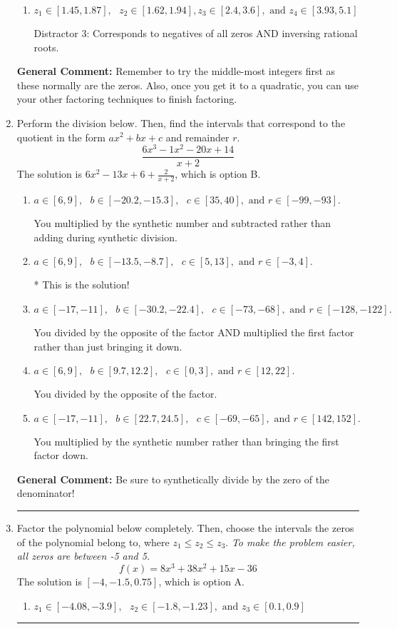 \documentclass{extbook}[14pt]
\newcommand{\litem}[1]{\item #1

\rule{\textwidth}{0.4pt}}
\begin{document}
\begin{enumerate}
{\begin{enumerate}[label=\Alph*.]
 Distractor 2: Corresponds to inversing rational roots.
\item \( z_1 \in [1.45, 1.87], \text{   }  z_2 \in [1.62, 1.94], z_3 \in [2.4, 3.6], \text{   and   } z_4 \in [3.93, 5.1] \)

 Distractor 3: Corresponds to negatives of all zeros AND inversing rational roots.
\end{enumerate}

\textbf{General Comment:} Remember to try the middle-most integers first as these normally are the zeros. Also, once you get it to a quadratic, you can use your other factoring techniques to finish factoring.
}
\litem{
Perform the division below. Then, find the intervals that correspond to the quotient in the form $ax^2+bx+c$ and remainder $r$.
\[ \frac{6x^{3} -1 x^{2} -20 x + 14}{x + 2} \]The solution is \( 6x^{2} -13 x + 6 + \frac{2}{x + 2} \), which is option B.\begin{enumerate}[label=\Alph*.]
\item \( a \in [6, 9], \text{   } b \in [-20.2, -15.3], \text{   } c \in [35, 40], \text{   and   } r \in [-99, -93]. \)

 You multiplied by the synthetic number and subtracted rather than adding during synthetic division.
\item \( a \in [6, 9], \text{   } b \in [-13.5, -8.7], \text{   } c \in [5, 13], \text{   and   } r \in [-3, 4]. \)

* This is the solution!
\item \( a \in [-17, -11], \text{   } b \in [-30.2, -22.4], \text{   } c \in [-73, -68], \text{   and   } r \in [-128, -122]. \)

 You divided by the opposite of the factor AND multiplied the first factor rather than just bringing it down.
\item \( a \in [6, 9], \text{   } b \in [9.7, 12.2], \text{   } c \in [0, 3], \text{   and   } r \in [12, 22]. \)

 You divided by the opposite of the factor.
\item \( a \in [-17, -11], \text{   } b \in [22.7, 24.5], \text{   } c \in [-69, -65], \text{   and   } r \in [142, 152]. \)

 You multiplied by the synthetic number rather than bringing the first factor down.
\end{enumerate}

\textbf{General Comment:} Be sure to synthetically divide by the zero of the denominator!
}
\litem{
Factor the polynomial below completely. Then, choose the intervals the zeros of the polynomial belong to, where $z_1 \leq z_2 \leq z_3$. \textit{To make the problem easier, all zeros are between -5 and 5.}
\[ f(x) = 8x^{3} +38 x^{2} +15 x -36 \]The solution is \( [-4, -1.5, 0.75] \), which is option A.\begin{enumerate}[label=\Alph*.]
\item \( z_1 \in [-4.08, -3.9], \text{   }  z_2 \in [-1.8, -1.23], \text{   and   } z_3 \in [0.1, 0.9] \)


\end{enumerate}}
\end{enumerate}
\end{document}
